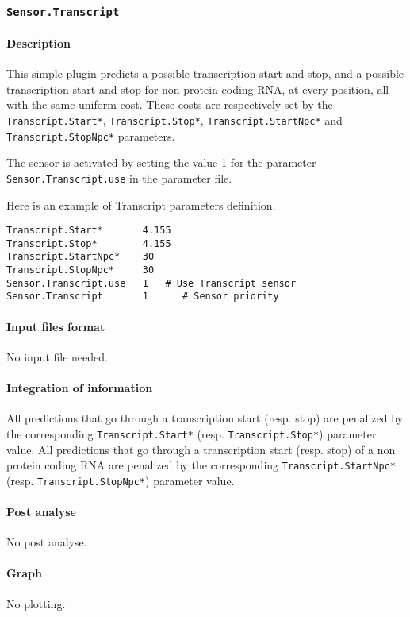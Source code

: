 
\subsubsection{\texttt{Sensor.Transcript}}

\paragraph{Description}

This simple plugin predicts a possible transcription start and stop,
and a possible transcription start and stop for non protein coding
RNA, at every position, all with the same uniform cost. These costs
are respectively set by the \texttt{Transcript.Start*},
\texttt{Transcript.Stop*}, \texttt{Transcript.StartNpc*} and
\texttt{Transcript.StopNpc*} parameters.

The sensor is activated by setting the value 1 for the parameter
\texttt{Sensor.Transcript.use} in the parameter file. 

Here is an example of Transcript parameters definition.
\begin{Verbatim}[fontsize=\small]
Transcript.Start*       4.155
Transcript.Stop*        4.155
Transcript.StartNpc*    30
Transcript.StopNpc*     30
Sensor.Transcript.use   1   # Use Transcript sensor
Sensor.Transcript       1      # Sensor priority
\end{Verbatim}

\paragraph{Input files format}

No input file needed.

\paragraph{Integration of information}

All predictions that go through a transcription start (resp. stop) are
penalized by the corresponding \texttt{Transcript.Start*} (resp.
\texttt{Transcript.Stop*}) parameter value.  All predictions that go
through a transcription start (resp. stop) of a non protein coding RNA
are penalized by the corresponding \texttt{Transcript.StartNpc*}
(resp.  \texttt{Transcript.StopNpc*}) parameter value.

\paragraph{Post analyse}

No post analyse.

\paragraph{Graph}

No plotting.




